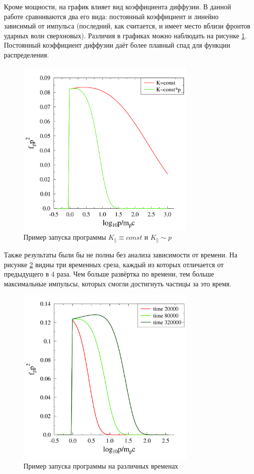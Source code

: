 \documentclass[a4paper,14pt]{extarticle} %
\begin{document}
Кроме мощности, на график влияет вид коэффициента диффузии. В данной работе сравниваются два его вида: постоянный коэффициент и линейно зависимый от импульса (последний, как считается, и имеет место вблизи фронтов ударных волн сверхновых). Различия в графиках можно наблюдать на рисунке \ref{res/razn/bom}. Постоянный коэффициент диффузии даёт более плавный спад для функции распределения.

\begin{figure}[H]
\centering
\includegraphics[width=250pt]{r_bom_or_not2}
\caption{Пример запуска программы $K_\parallel\equiv const$ и $K_\parallel \sim p $}
\label{res/razn/bom}
\end{figure}

Также результаты были бы не полны без анализа зависимости от времени. На рисунке \ref{res/razn/times} видны три временных среза, каждый из которых отличается от предыдущего в 4 раза. Чем больше развёртка по времени, тем больше максимальные импульсы, которых смогли достигнуть частицы за это время.
\begin{figure}[H]
\centering
\includegraphics[width=250pt]{r_times}
\caption{Пример запуска программы на различных временах}
\label{res/razn/times}
\end{figure}
\end{document}
